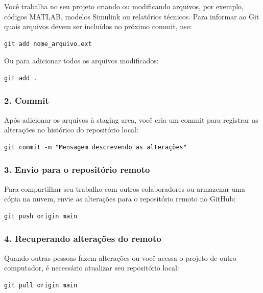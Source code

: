 Você trabalha no seu projeto criando ou modificando arquivos, por exemplo, códigos MATLAB, modelos Simulink ou relatórios técnicos. Para informar ao Git quais arquivos devem ser incluídos no próximo commit, use:

\begin{lstlisting}[style=shellstyle]
git add nome_arquivo.ext
\end{lstlisting}

Ou para adicionar todos os arquivos modificados:

\begin{lstlisting}[style=shellstyle]
git add .
\end{lstlisting}

\subsubsection*{2. Commit}

Após adicionar os arquivos à staging area, você cria um commit para registrar as alterações no histórico do repositório local:

\begin{lstlisting}[style=shellstyle]
git commit -m "Mensagem descrevendo as alterações"
\end{lstlisting}

\subsubsection*{3. Envio para o repositório remoto}

Para compartilhar seu trabalho com outros colaboradores ou armazenar uma cópia na nuvem, envie as alterações para o repositório remoto no GitHub:

\begin{lstlisting}[style=shellstyle]
git push origin main
\end{lstlisting}

\subsubsection*{4. Recuperando alterações do remoto}

Quando outras pessoas fazem alterações ou você acessa o projeto de outro computador, é necessário atualizar seu repositório local:

\begin{lstlisting}[style=shellstyle]
git pull origin main
\end{lstlisting}

